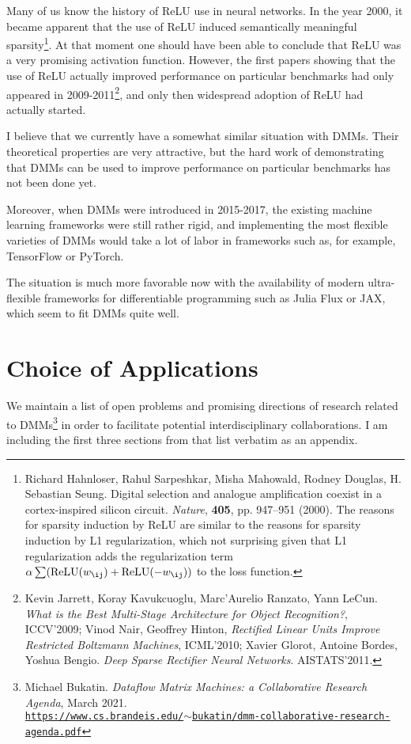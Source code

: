 \documentclass{article}
\begin{document}
Many of us know the history of ReLU use in neural networks. In the year 2000, it became apparent that
the use of ReLU induced semantically meaningful sparsity\footnote{Richard Hahnloser, Rahul Sarpeshkar, 
Misha Mahowald, Rodney Douglas, H. Sebastian Seung. 
Digital selection and analogue amplification coexist in a cortex-inspired silicon circuit.
{\em Nature}, {\bf 405}, pp. 947–951 (2000). The reasons for sparsity induction by ReLU are similar
to the reasons for sparsity induction by L1 regularization, which not surprising given that 
L1 regularization adds the regularization term $\alpha\sum(\mbox{ReLU}(w_{\ij})+\mbox{ReLU}(-w_{\ij}))$ to the loss function.}. At that moment
one should have been able to conclude that ReLU was a very promising activation function.
However, the first papers showing that the use of ReLU actually improved performance on particular
benchmarks had only appeared in 2009-2011\footnote{Kevin Jarrett, Koray Kavukcuoglu, Marc’Aurelio Ranzato, Yann LeCun. {\em What is the Best Multi-Stage Architecture for Object Recognition?}, ICCV'2009; Vinod Nair, Geoffrey Hinton,
{\em Rectified Linear Units Improve Restricted Boltzmann Machines}, ICML'2010; Xavier Glorot, Antoine Bordes, Yoshua Bengio. 
{\em Deep Sparse Rectifier Neural Networks}. AISTATS'2011.}, and only then widespread adoption of ReLU
had actually started.

I believe that we currently have a somewhat similar situation with DMMs. Their theoretical properties are very attractive,
but the hard work of demonstrating that DMMs can be used to improve performance on particular benchmarks
has not been done yet.

Moreover, when DMMs were introduced in 2015-2017, the existing machine learning frameworks
were still rather rigid, and implementing the most flexible varieties of DMMs would take a lot of labor
in frameworks such as, for example, TensorFlow or PyTorch. 

The situation is much more favorable now with
the availability of modern ultra-flexible frameworks for differentiable programming such as Julia Flux or JAX,
which seem to fit DMMs quite well.

\section{Choice of Applications}

We maintain a list of open problems and promising directions of research related to 
DMMs\footnote{Michael Bukatin. {\em Dataflow Matrix Machines:  a Collaborative Research Agenda}, March 2021.\\
\href{https://www.cs.brandeis.edu/~bukatin/dmm-collaborative-research-agenda.pdf}
{\tt https://www.cs.brandeis.edu/$\sim$bukatin/dmm-collaborative-research-agenda.pdf}} in order to facilitate potential
interdisciplinary collaborations. I am including the first three
sections from that list verbatim as an appendix. 
\end{document}
